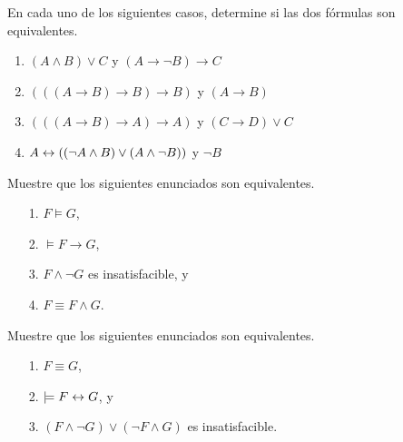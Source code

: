 \message{ !name(main.tex)}\documentclass[12pt,a4paper]{book}
\begin{document}
    \begin{ejercicio}
        En cada uno de los siguientes casos, determine si las dos fórmulas son equivalentes.
        \begin{enumerate}[label=(\alph*)]
            \item $(A\wedge B)\vee C$ y $(A\rightarrow\neg B)\rightarrow C$
            \item $(((A\rightarrow B)\rightarrow B)\rightarrow B)$ y $(A\rightarrow B)$
            \item $(((A\rightarrow B)\rightarrow A)\rightarrow A)$ y $(C\rightarrow D)\vee C$
            \item $A\leftrightarrow((\neg A\wedge B)\vee(A\wedge\neg B))$ y $\neg B$
        \end{enumerate}
    \end{ejercicio}

    \begin{ejercicio}
        Muestre que los siguientes enunciados son equivalentes.
        \begin{enumerate}
            \item[1.] $F\models G$,
            \item[2.] $\models F\rightarrow G$,
            \item[3.] $F\wedge\neg G$ es insatisfacible, y
            \item[4.] $F\equiv F\wedge G$.
        \end{enumerate}
    \end{ejercicio}

    \begin{ejercicio}
        Muestre que los siguientes enunciados son equivalentes.
        \begin{enumerate}
            \item[1.] $F\equiv G$,
            \item[2.] $\models F\leftrightarrow G$, y
            \item[3.] $(F\wedge\neg G)\vee(\neg F\wedge G)$ es insatisfacible.
        \end{enumerate}
    \end{ejercicio}
\end{document}

